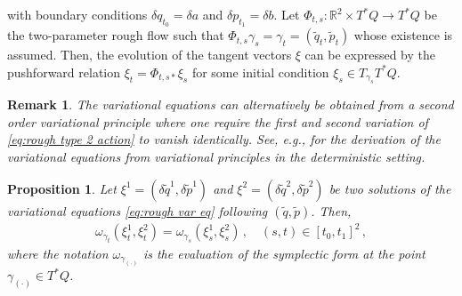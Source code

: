 \documentclass[11pt, oneside]{article}
\numberwithin{equation}{section}
\newtheorem{proposition}[lemma]{Proposition}
\newtheorem{remark}{Remark}[section]
\theoremstyle{definition}
\newcommand{\wt}[1]{\widetilde{#1}}
\begin{document}
with boundary conditions $\delta q_{t_0} = \delta a$ and $\delta p_{t_1} = \delta b$. Let $\Phi_{t,s} : \mathbb{R}^2\times T^*Q \rightarrow T^*Q$ be the two-parameter rough flow such that $\Phi_{t,s} \gamma_s =\gamma_t = (\wt{q}_t, \wt{p}_t)$ whose existence is assumed. Then, the evolution of the tangent vectors $\xi$ can be expressed by the pushforward relation $\xi_t = \Phi_{t,s *} \xi_s$ for some initial condition $\xi_s \in T_{\gamma_s}T^*Q$. 
\begin{remark}
    The variational equations can alternatively be obtained from a second order variational principle where one require the first and second variation of \eqref{eq:rough type 2 action} to vanish identically. See, e.g., \cite{Jost2017, HHS2025a} for the derivation of the variational equations from variational principles in the deterministic setting.
\end{remark}
\begin{proposition}\label{prop: first poincare inv}
    Let $\xi^1 = (\delta \wt{q}^1, \delta \wt{p}^1)$ and $\xi^2 = (\delta \wt{q}^2, \delta \wt{p}^2)$ be two solutions of the variational equations \eqref{eq:rough var eq} following $(\wt{q}, \wt{p})$. Then,
    \begin{align}
        \omega_{\gamma_t}(\xi^1_t, \xi^2_t) = \omega_{\gamma_s}(\xi^1_s, \xi^2_s)\,,\quad (s,t) \in [t_0, t_1]^2\,,
    \end{align}
    where the notation $\omega_{\gamma_{(\cdot)}}$ is the evaluation of the symplectic form at the point $\gamma_{(\cdot)} \in T^*Q$.
\end{proposition}
\end{document}
